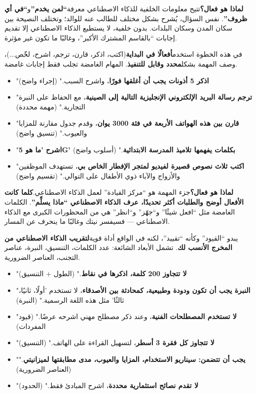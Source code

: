 \textbf{لماذا هو فعال؟}تتيح معلومات الخلفية للذكاء الاصطناعي معرفة\textbf{“لمن يخدم”}و\textbf{“في أي ظروف”}. نفس السؤال، يُشرح بشكل مختلف للطالب عنه للوالد؛ وتختلف النصيحة بين سكان المدن وسكان البلدات. بدون خلفية، لا يستطيع الذكاء الاصطناعي إلا تقديم إجابات “بالقاسم المشترك الأكبر”، وغالبًا ما تكون غير مؤثرة.


في هذه الخطوة استخدم\textbf{أفعالًا في البداية}(اكتب، اذكر، قارن، ترجم، اشرح، لخّص...)، وصف المهمة بشكل\textbf{محدد وقابل للتنفيذ}. المهام الغامضة تجلب فقط إجابات غامضة.


\begin{itemize}
  \item "\textbf{اذكر 5 أذونات يجب أن أغلقها فورًا}، واشرح السبب." (إجراء واضح)
  \item "\textbf{ترجم رسالة البريد الإلكتروني الإنجليزية التالية إلى الصينية}، مع الحفاظ على النبرة التجارية." (مهمة محددة)
  \item "\textbf{قارن بين هذه الهواتف الأربعة في فئة 3000 يوان}، وقدم جدول مقارنة للمزايا والعيوب." (تنسيق واضح)
  \item "\textbf{اشرح 'ما هو 5G' بكلمات يفهمها تلاميذ المدرسة الابتدائية}." (أسلوب واضح)
  \item "\textbf{اكتب ثلاث نصوص قصيرة لفيديو لمتجر الإفطار الخاص بي}، تستهدف الموظفين والأزواج والآباء ذوي الأطفال على التوالي." (تقسيم واضح)
\end{itemize}

\textbf{لماذا هو فعال؟}جزء المهمة هو “مركز القيادة” لعمل الذكاء الاصطناعي.\textbf{كلما كانت الأفعال أوضح والطلبات أكثر تحديدًا، عرف الذكاء الاصطناعي “ماذا يسلِّم”}. الكلمات الغامضة مثل “افعل شيئًا” و“جهّز” و“انظر” هي من المحظورات الكبرى مع الذكاء الاصطناعي — فسيفسر نيتك وغالبًا ما ينحرف عن المسار.


يبدو “القيود” وكأنه “تقييد”، لكنه في الواقع أداة قوية\textbf{لتقريب الذكاء الاصطناعي من المخرج الأنسب لك}. تشمل الأبعاد الشائعة: عدد الكلمات، التنسيق، النبرة، عناصر التجنب، العناصر الضرورية.


\begin{itemize}
  \item "\textbf{لا تتجاوز 200 كلمة، اذكرها في نقاط}." (الطول + التنسيق)
  \item "\textbf{النبرة يجب أن تكون ودودة وطبيعية، كمحادثة بين الأصدقاء}، لا تستخدم 'أولًا، ثانيًا، ثالثًا' مثل هذه اللغة الرسمية." (النبرة)
  \item "\textbf{لا تستخدم المصطلحات الفنية}، وعند ذكر مصطلح مهني اشرحه عرضًا." (قيود المفردات)
  \item "\textbf{لا تتجاوز كل فقرة 3 أسطر}، لتسهيل القراءة على الهاتف." (التنسيق)
  \item "\textbf{يجب أن تتضمن: سيناريو الاستخدام، المزايا والعيوب، مدى مطابقتها لميزانيتي}." (العناصر الضرورية)
  \item "\textbf{لا تقدم نصائح استثمارية محددة}، اشرح المبادئ فقط." (الحدود)
\end{itemize}

